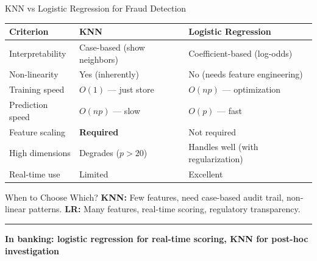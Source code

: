 \documentclass[8pt,aspectratio=169]{beamer}
\newcommand{\bottomnote}[1]{%
\vfill
\vspace{-2mm}
\textcolor{mllavender2}{\rule{\textwidth}{0.4pt}}
\vspace{1mm}
\footnotesize
\textbf{#1}
}
\newcommand{\highlight}[1]{\textcolor{mlorange}{\textbf{#1}}}
\begin{document}
\begin{frame}[t]{KNN vs Logistic Regression for Fraud Detection}
\small
\vspace{1mm}
\footnotesize
\begin{tabular}{lll}
\toprule
\textbf{Criterion} & \textbf{KNN} & \textbf{Logistic Regression} \\
\midrule
Interpretability & Case-based (show neighbors) & Coefficient-based (log-odds) \\
Non-linearity & Yes (inherently) & No (needs feature engineering) \\
Training speed & $O(1)$ --- just store & $O(np)$ --- optimization \\
Prediction speed & $O(np)$ --- \textcolor{mlred}{slow} & $O(p)$ --- \textcolor{mlgreen}{fast} \\
Feature scaling & \highlight{Required} & Not required \\
High dimensions & Degrades ($p > 20$) & Handles well (with regularization) \\
Real-time use & Limited & \textcolor{mlgreen}{Excellent} \\
\bottomrule
\end{tabular}

\vspace{3mm}
\begin{block}{When to Choose Which?}
\footnotesize \textbf{KNN:} Few features, need case-based audit trail, non-linear patterns. \quad \textbf{LR:} Many features, real-time scoring, regulatory transparency.
\end{block}
\bottomnote{In banking: logistic regression for real-time scoring, KNN for post-hoc investigation}
\end{frame}
\end{document}

